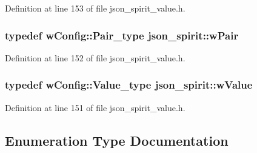 Definition at line 153 of file json\+\_\+spirit\+\_\+value.\+h.

\hypertarget{namespacejson__spirit_a01eb532cdeea8e5fb47857e67444408c}{}
\subsubsection[{w\+Pair}]{\setlength{\rightskip}{0pt plus 5cm}typedef {\bf w\+Config\+::\+Pair\+\_\+type} {\bf json\+\_\+spirit\+::w\+Pair}}\label{namespacejson__spirit_a01eb532cdeea8e5fb47857e67444408c}


Definition at line 152 of file json\+\_\+spirit\+\_\+value.\+h.

\hypertarget{namespacejson__spirit_a048cde4e921b6f41cbc0fab1cbc352e8}{}
\subsubsection[{w\+Value}]{\setlength{\rightskip}{0pt plus 5cm}typedef {\bf w\+Config\+::\+Value\+\_\+type} {\bf json\+\_\+spirit\+::w\+Value}}\label{namespacejson__spirit_a048cde4e921b6f41cbc0fab1cbc352e8}


Definition at line 151 of file json\+\_\+spirit\+\_\+value.\+h.



\subsection{Enumeration Type Documentation}
\hypertarget{namespacejson__spirit_aeaad57c912e0370a76f60cd510ad3d74}{}

